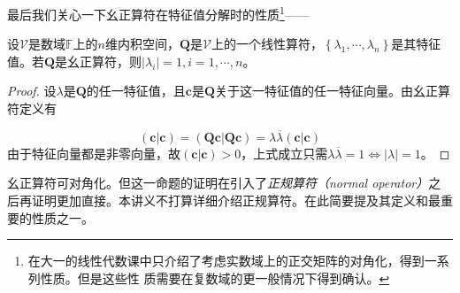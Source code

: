 \documentclass[main.tex]{subfiles}
\begin{document}
最后我们关心一下幺正算符在特征值分解时的性质\footnote{在大一的线性代数课中只介绍了考虑实数域上的正交矩阵的对角化\cite[§5.3 定理 3.7]{周胜林2012线性代数}，得到一系列性质。但是这些性
    质需要在复数域的更一般情况下得到确认。}——
\begin{theorem}\label{thm:II.2.34}
    设$\mathcal{V}$是数域$\mathbb{F}$上的$n$维内积空间，$\mathbf{Q}$是$\mathcal{V}$上的一个线性算符，$\left\{\lambda_1,\cdots,\lambda_n\right\}$是其特征值。若$\mathbf{Q}$是幺正算符，则$\left|\lambda_i\right|=1, i=1,\cdots,n$。
\end{theorem}
\begin{proof}
    设$\lambda$是$\mathbf{Q}$的任一特征值，且$\mathbf{c}$是$\mathbf{Q}$关于这一特征值的任一特征向量。由幺正算符定义有

    \[
        \left(\mathbf{c}|\mathbf{c}\right)=\left(\mathbf{Qc}|\mathbf{Qc}\right)=\lambda\overline{\lambda}\left(\mathbf{c}|\mathbf{c}\right)
    \]
    由于特征向量都是非零向量，故$\left(\mathbf{c}|\mathbf{c}\right)>0$，上式成立只需$\lambda\overline{\lambda}=1\Leftrightarrow\left|\lambda\right|=1$。
\end{proof}

幺正算符可对角化。但这一命题的证明在引入了\emph{正规算符（normal operator）}之后再证明更加直接。本讲义不打算详细介绍正规算符。在此简要提及其定义和最重要的性质之一。
\end{document}
